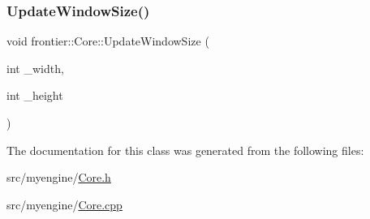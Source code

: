 \subsubsection{\texorpdfstring{Update\+Window\+Size()}{UpdateWindowSize()}}
{\footnotesize\ttfamily void frontier\+::\+Core\+::\+Update\+Window\+Size (\begin{DoxyParamCaption}\item[{int}]{\+\_\+width,  }\item[{int}]{\+\_\+height }\end{DoxyParamCaption})}



The documentation for this class was generated from the following files\+:\begin{DoxyCompactItemize}
\item 
src/myengine/\hyperlink{_core_8h}{Core.\+h}\item 
src/myengine/\hyperlink{_core_8cpp}{Core.\+cpp}\end{DoxyCompactItemize}

